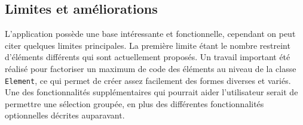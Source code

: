 \subsection{Limites et améliorations}
L'application possède une base intéressante et fonctionnelle, cependant on peut citer quelques limites principales.
La première limite étant le nombre restreint d'éléments différents qui sont actuellement proposés.
Un travail important été réalisé pour factoriser un maximum de code des éléments au niveau de la classe \lstinline$Element$, ce qui permet de créer assez facilement des formes diverses et variés.
Une des fonctionnalités supplémentaires qui pourrait aider l'utilisateur serait de permettre une sélection groupée, en plus des différentes fonctionnalités optionnelles décrites auparavant.

